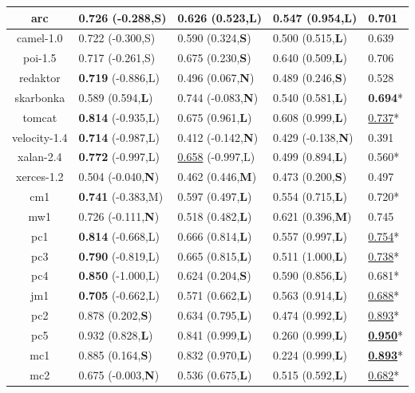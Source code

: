 \begin{table}[!t]
\begin{tabular}{|@{}c@{}||@{}C{21mm}@{}|@{}C{21mm}@{}|@{}C{21mm}@{}||@{}C{8mm}@{}|}
arc &0.726 (-0.288,S)       &0.626 (0.523,{\bf L})  &0.547 (0.954,{\bf L})  &0.701 \\ \hline
camel-1.0   &0.722 (-0.300,S)       &0.590 (0.324,{\bf S})  &0.500 (0.515,{\bf L})  &0.639 \\ \hline
poi-1.5     &0.717 (-0.261,S)       &0.675 (0.230,{\bf S})  &0.640 (0.509,{\bf L})  &0.706 \\ \hline
redaktor    &{\bf 0.719} (-0.886,L) &0.496 (0.067,{\bf N})  &0.489 (0.246,{\bf S})  &0.528 \\ \hline
skarbonka   &0.589 (0.594,{\bf L})  &0.744 (-0.083,{\bf N}) &0.540 (0.581,{\bf L})  &{\bf 0.694}* \\ \hline
tomcat      &{\bf 0.814} (-0.935,L) &0.675 (0.961,{\bf L})  &0.608 (0.999,{\bf L})  &\underline{0.737}* \\ \hline
velocity-1.4        &{\bf 0.714} (-0.987,L) &0.412 (-0.142,{\bf N}) &0.429 (-0.138,{\bf N}) &0.391 \\ \hline
xalan-2.4   &{\bf 0.772} (-0.997,L) &\underline{0.658} (-0.997,L)   &0.499 (0.894,{\bf L})  &0.560* \\ \hline
xerces-1.2  &0.504 (-0.040,{\bf N}) &0.462 (0.446,{\bf M})  &0.473 (0.200,{\bf S})  &0.497 \\ \hline
cm1 &{\bf 0.741} (-0.383,M) &0.597 (0.497,{\bf L})  &0.554 (0.715,{\bf L})  &0.720* \\ \hline
mw1 &0.726 (-0.111,{\bf N}) &0.518 (0.482,{\bf L})  &0.621 (0.396,{\bf M})  &0.745 \\ \hline
pc1 &{\bf 0.814} (-0.668,L) &0.666 (0.814,{\bf L})  &0.557 (0.997,{\bf L})  &\underline{0.754}* \\ \hline
pc3 &{\bf 0.790} (-0.819,L) &0.665 (0.815,{\bf L})  &0.511 (1.000,{\bf L})  &\underline{0.738}* \\ \hline
pc4 &{\bf 0.850} (-1.000,L) &0.624 (0.204,{\bf S})  &0.590 (0.856,{\bf L})  &0.681* \\ \hline
jm1 &{\bf 0.705} (-0.662,L) &0.571 (0.662,{\bf L})  &0.563 (0.914,{\bf L})  &\underline{0.688}* \\ \hline
pc2 &0.878 (0.202,{\bf S})  &0.634 (0.795,{\bf L})  &0.474 (0.992,{\bf L})  &\underline{0.893}* \\ \hline
pc5 &0.932 (0.828,{\bf L})  &0.841 (0.999,{\bf L})  &0.260 (0.999,{\bf L})  &\underline{{\bf 0.950}}* \\ \hline
mc1 &0.885 (0.164,{\bf S})  &0.832 (0.970,{\bf L})  &0.224 (0.999,{\bf L})  &\underline{{\bf 0.893}}* \\ \hline
mc2 &0.675 (-0.003,{\bf N}) &0.536 (0.675,{\bf L})  &0.515 (0.592,{\bf L})  &\underline{0.682}* \\ \hline

\end{tabular}
\end{table}
